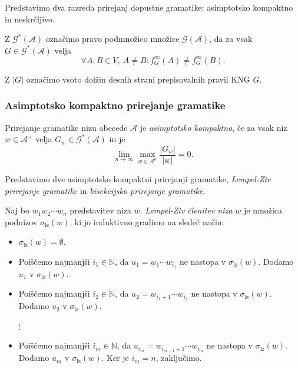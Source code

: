 \documentclass[fin1, tisk]{fmfdelo}
\providecommand{\abs}[1]{\left\lvert #1 \right\rvert}
\newcommand{\N}{\mathbb{N}}
\newcommand{\A}{\mathcal{A}}
\newcommand{\G}{\mathcal{G}}
\theoremstyle{definition}
\begin{document}
Predstavimo dva razreda prirejanj dopustne gramatike: asimptotsko kompaktno in neskrčljivo.

\begin{definicija}
    Z $\G^*(\A)$ označimo pravo podmnožico množice $\G(\A)$, da za vsak $G \in \G^*(\A)$ velja
    \[
        \forall A,B \in V, \ A \neq B \colon f_G^\infty(A) \neq f_G^\infty(B).
    \]
\end{definicija}

\begin{definicija}
    Z $\abs{G}$ označimo vsoto dolžin desnih strani prepisovalnih pravil KNG $G$.
\end{definicija}

\subsubsection{Asimptotsko kompaktno prirejanje gramatike}

\begin{definicija}
    Prirejanje gramatike nizu abecede $\A$ je \textit{asimptotsko kompaktno}, če za vsak niz
    $w \in \A^+$ velja $G_w \in \G^*(\A)$ in je
    \[
        \lim_{n \rightarrow \infty} \max_{w \in \A^n} \frac{\abs{G_w}}{\abs{w}} = 0.
    \]
\end{definicija}

Predstavimo dve asimptotsko kompaktni prirejanji gramatike, \emph{Lempel-Ziv prirejanje gramatike}
in \emph{bisekcijsko prirejanje gramatike}.

\begin{definicija}
    Naj bo $ w_1w_2 \cdots w_n$ predstavitev niza $w$. 
    \emph{Lempel-Ziv členitev niza $w$} je množica podnizov $\sigma_\text{lz}(w)$,
    ki jo induktivno gradimo na sledeč način:
    \begin{itemize}
        \item $\sigma_\text{lz}(w) = \emptyset$.
        \item Poiščemo najmanjši $i_1 \in \N$, da $u_1 = w_1 \cdots w_{i_1}$ ne nastopa v 
        $\sigma_{\text{lz}}(w)$. Dodamo $u_1$ v $\sigma_{\text{lz}}(w)$.
        \item Poiščemo najmanjši $i_2 \in \N$, da $u_2 = w_{i_1+1} \cdots w_{i_2}$ ne nastopa v 
        $\sigma_{\text{lz}}(w)$. Dodamo $u_2$ v $\sigma_{\text{lz}}(w)$. \\
        \begin{center}
        $\vdots$
        \end{center}
        \item Poiščemo najmanjši $i_{m} \in \N$, da $u_{i_m} = w_{i_{m-1}+1} \cdots w_{i_m}$
        ne nastopa v $\sigma_{\text{lz}}(w)$. Dodamo $u_m$ v $\sigma_{\text{lz}}(w)$.
        Ker je $i_m = n$, zaključimo.
    \end{itemize}
\end{definicija}
\end{document}
